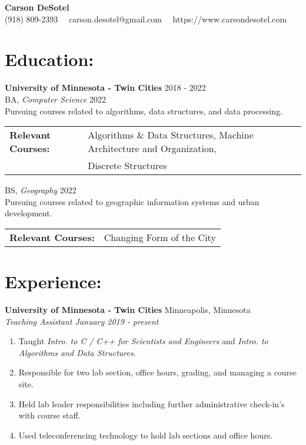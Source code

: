 \documentclass[10pt]{article}
\begin{document}
	\begin{center}
		{\LARGE \textbf{Carson DeSotel}} \\
		\vspace{5pt} 		%
		(918) 809-2393 \ \textbullet \
		carson.desotel@gmail.com \ \textbullet \
		https://www.carsondesotel.com \
		
	\end{center}
	
	\hrulefill
	
	\section*{Education:}
		\textbf{University of Minnesota - Twin Cities} \hfill 2018 - 2022 \\
		\indent BA, \textit{Computer Science} \hfill 2022 \\
		\indent \indent Pursuing courses related to algorithms, data structures, and data processing. \\
		\indent \indent 
		\begin{tabular}{@{}l@{\ }l}
		\textbf{Relevant Courses: } & Algorithms \& Data Structures, Machine Architecture and Organization, \\ & Discrete Structures \\
		\end{tabular}
		
		\vspace{5pt}
		
		\indent BS, \textit{Geography} \hfill 2022 \\
		\indent \indent Pursuing courses related to geographic information systems and urban development. \\
		\indent \indent
		\begin{tabular}{@{}l@{\ }l}
		\textbf{Relevant Courses: } & Changing Form of the City \\
		\end{tabular}
		
	\hrulefill
	
	\section*{Experience:}
		\textbf{University of Minnesota - Twin Cities} \hfill Minneapolis, Minnesota \\
		\textit{Teaching Assistant \hfill January 2019 - present }
		\begin{enumerate}[label=--]
			\item Taught \textit{Intro. to C / C++ for Scientists and Engineers} and \textit{Intro. to Algorithms and Data Structures}.
			\item Responsible for two lab section, office hours, grading, and managing a course site.
			\item Held lab leader responsibilities including further administrative check-in's with course staff.
			\item Used teleconferencing technology to hold lab sections and office hours.
		\end{enumerate}
	
\end{document}

